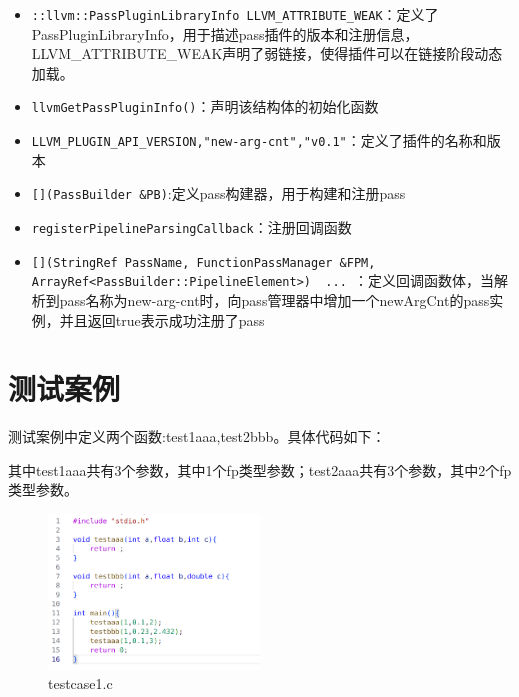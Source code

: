 \documentclass[11pt, a4paper, oneside,UTF8]{ctexart}
\begin{document}
\begin{itemize}[before=]
    \setlength{\itemsep}{0em}
    \item \texttt{::llvm::PassPluginLibraryInfo LLVM\_ATTRIBUTE\_WEAK}：定义了PassPluginLibraryInfo，用于描述pass插件的版本和注册信息，LLVM\_ATTRIBUTE\_WEAK声明了弱链接，使得插件可以在链接阶段动态加载。
    \item \texttt{llvmGetPassPluginInfo()}：声明该结构体的初始化函数
    \item \texttt{LLVM\_PLUGIN\_API\_VERSION,"new-arg-cnt","v0.1"}：定义了插件的名称和版本
    \item \texttt{[](PassBuilder \&PB)}:定义pass构建器，用于构建和注册pass
    \item \texttt{registerPipelineParsingCallback}：注册回调函数
    \item \texttt{[](StringRef PassName, FunctionPassManager \&FPM, ArrayRef<PassBuilder::PipelineElement>) { ... }}：定义回调函数体，当解析到pass名称为new-arg-cnt时，向pass管理器中增加一个newArgCnt的pass实例，并且返回true表示成功注册了pass
    
\end{itemize}

\section{测试案例}

测试案例中定义两个函数:test1aaa,test2bbb。具体代码如下：

其中test1aaa共有3个参数，其中1个fp类型参数；test2aaa共有3个参数，其中2个fp类型参数。

\begin{figure}[h]
    \centering
    \includegraphics[width=0.5\textwidth]{./figure/test_1.png}
    \caption{testcase1.c}
    \label{figure:3.1}
\end{figure}
\end{document}
